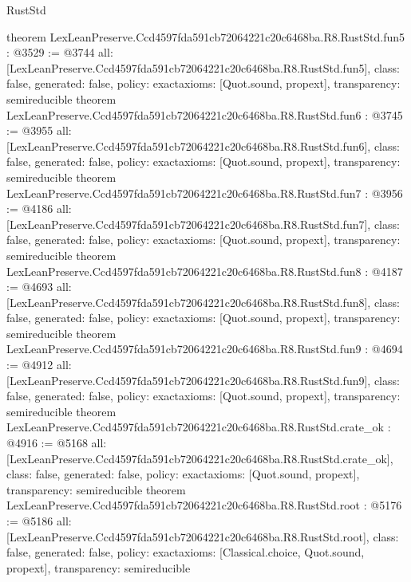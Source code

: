 \begin{lexlean}{RustStd}
\begin{coremodule}
{}
theorem LexLeanPreserve.Ccd4597fda591cb72064221c20c6468ba.R8.RustStd.fun5 : @3529 := @3744 {
  all: [LexLeanPreserve.Ccd4597fda591cb72064221c20c6468ba.R8.RustStd.fun5],
  class: false,
  generated: false,
  policy: exact{axioms: [Quot.sound, propext]},
  transparency: semireducible
}
theorem LexLeanPreserve.Ccd4597fda591cb72064221c20c6468ba.R8.RustStd.fun6 : @3745 := @3955 {
  all: [LexLeanPreserve.Ccd4597fda591cb72064221c20c6468ba.R8.RustStd.fun6],
  class: false,
  generated: false,
  policy: exact{axioms: [Quot.sound, propext]},
  transparency: semireducible
}
theorem LexLeanPreserve.Ccd4597fda591cb72064221c20c6468ba.R8.RustStd.fun7 : @3956 := @4186 {
  all: [LexLeanPreserve.Ccd4597fda591cb72064221c20c6468ba.R8.RustStd.fun7],
  class: false,
  generated: false,
  policy: exact{axioms: [Quot.sound, propext]},
  transparency: semireducible
}
theorem LexLeanPreserve.Ccd4597fda591cb72064221c20c6468ba.R8.RustStd.fun8 : @4187 := @4693 {
  all: [LexLeanPreserve.Ccd4597fda591cb72064221c20c6468ba.R8.RustStd.fun8],
  class: false,
  generated: false,
  policy: exact{axioms: [Quot.sound, propext]},
  transparency: semireducible
}
theorem LexLeanPreserve.Ccd4597fda591cb72064221c20c6468ba.R8.RustStd.fun9 : @4694 := @4912 {
  all: [LexLeanPreserve.Ccd4597fda591cb72064221c20c6468ba.R8.RustStd.fun9],
  class: false,
  generated: false,
  policy: exact{axioms: [Quot.sound, propext]},
  transparency: semireducible
}
theorem LexLeanPreserve.Ccd4597fda591cb72064221c20c6468ba.R8.RustStd.crate_ok : @4916 := @5168 {
  all: [LexLeanPreserve.Ccd4597fda591cb72064221c20c6468ba.R8.RustStd.crate_ok],
  class: false,
  generated: false,
  policy: exact{axioms: [Quot.sound, propext]},
  transparency: semireducible
}
theorem LexLeanPreserve.Ccd4597fda591cb72064221c20c6468ba.R8.RustStd.root : @5176 := @5186 {
  all: [LexLeanPreserve.Ccd4597fda591cb72064221c20c6468ba.R8.RustStd.root],
  class: false,
  generated: false,
  policy: exact{axioms: [Classical.choice, Quot.sound, propext]},
  transparency: semireducible
}


\end{coremodule}
\end{lexlean}
